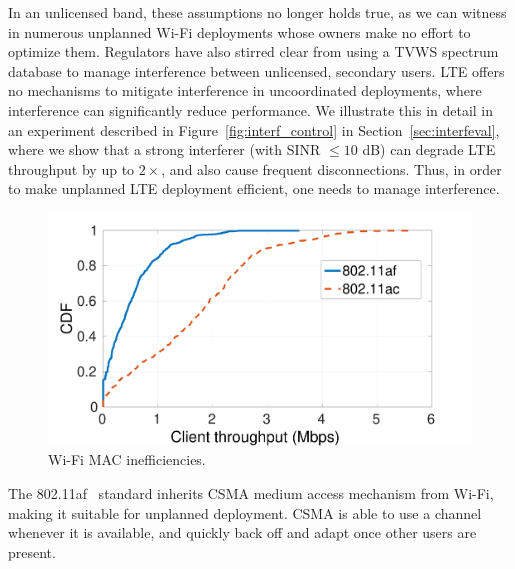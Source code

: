 In an unlicensed band, these assumptions no longer holds true, as we can witness in numerous unplanned Wi-Fi deployments whose owners make no effort to optimize them. 
Regulators have also stirred clear from using a TVWS spectrum database to manage interference between unlicensed, secondary users. 
LTE offers no mechanisms to mitigate interference in uncoordinated deployments, where interference can significantly reduce performance. 
We illustrate this in detail in an experiment described in Figure~\ref{fig:interf_control} in Section~\ref{sec:interfeval},
where we show that a strong interferer (with SINR $\leq 10$ dB) can degrade LTE throughput by up to $2\times$, and also cause frequent disconnections. 
Thus, in order to make unplanned LTE deployment efficient, one needs to manage interference. 





\begin{figure}[t]
  \centering
    \includegraphics[width=\columnwidth, height=0.4\columnwidth]{./figs/af_vs_ac.pdf}
    \vspace{-0.3in}
  \caption{Wi-Fi MAC inefficiencies.}
  \label{fig:inefficiencies}
\vskip -8pt
\end{figure}



The 802.11af~\cite{Rice_af} standard inherits CSMA medium access mechanism from Wi-Fi, making it suitable for unplanned deployment. 
CSMA is able to use a channel whenever it is available, and quickly back off and adapt once other users are present. 

